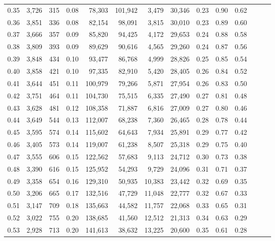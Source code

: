 \begin{tabular}{rrrrrrrrrrrrrr}
0.35 &  3,726 &  315 &  0.08 &   78,303 &  101,942 &   3,479 &  30,346 &  0.23 &  0.90 &      0.62 \\
0.36 &  3,851 &  336 &  0.08 &   82,154 &   98,091 &   3,815 &  30,010 &  0.23 &  0.89 &      0.60 \\
0.37 &  3,666 &  357 &  0.09 &   85,820 &   94,425 &   4,172 &  29,653 &  0.24 &  0.88 &      0.58 \\
0.38 &  3,809 &  393 &  0.09 &   89,629 &   90,616 &   4,565 &  29,260 &  0.24 &  0.87 &      0.56 \\
0.39 &  3,848 &  434 &  0.10 &   93,477 &   86,768 &   4,999 &  28,826 &  0.25 &  0.85 &      0.54 \\
0.40 &  3,858 &  421 &  0.10 &   97,335 &   82,910 &   5,420 &  28,405 &  0.26 &  0.84 &      0.52 \\
0.41 &  3,644 &  451 &  0.11 &  100,979 &   79,266 &   5,871 &  27,954 &  0.26 &  0.83 &      0.50 \\
0.42 &  3,751 &  464 &  0.11 &  104,730 &   75,515 &   6,335 &  27,490 &  0.27 &  0.81 &      0.48 \\
0.43 &  3,628 &  481 &  0.12 &  108,358 &   71,887 &   6,816 &  27,009 &  0.27 &  0.80 &      0.46 \\
0.44 &  3,649 &  544 &  0.13 &  112,007 &   68,238 &   7,360 &  26,465 &  0.28 &  0.78 &      0.44 \\
0.45 &  3,595 &  574 &  0.14 &  115,602 &   64,643 &   7,934 &  25,891 &  0.29 &  0.77 &      0.42 \\
0.46 &  3,405 &  573 &  0.14 &  119,007 &   61,238 &   8,507 &  25,318 &  0.29 &  0.75 &      0.40 \\
0.47 &  3,555 &  606 &  0.15 &  122,562 &   57,683 &   9,113 &  24,712 &  0.30 &  0.73 &      0.38 \\
0.48 &  3,390 &  616 &  0.15 &  125,952 &   54,293 &   9,729 &  24,096 &  0.31 &  0.71 &      0.37 \\
0.49 &  3,358 &  654 &  0.16 &  129,310 &   50,935 &  10,383 &  23,442 &  0.32 &  0.69 &      0.35 \\
0.50 &  3,206 &  665 &  0.17 &  132,516 &   47,729 &  11,048 &  22,777 &  0.32 &  0.67 &      0.33 \\
0.51 &  3,147 &  709 &  0.18 &  135,663 &   44,582 &  11,757 &  22,068 &  0.33 &  0.65 &      0.31 \\
0.52 &  3,022 &  755 &  0.20 &  138,685 &   41,560 &  12,512 &  21,313 &  0.34 &  0.63 &      0.29 \\
0.53 &  2,928 &  713 &  0.20 &  141,613 &   38,632 &  13,225 &  20,600 &  0.35 &  0.61 &      0.28 \\

\end{tabular}
